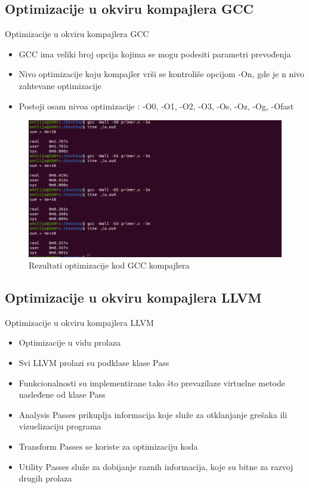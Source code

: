 \documentclass[compress, containsverbatim,mathserif, xcolor=dvipsnames, unicode]{beamer}
\begin{document}
\subsection{Optimizacije u okviru kompajlera GCC}
\begin{frame}{Optimizacije u okviru kompajlera GCC}
    \begin{itemize}
        \item GCC ima veliki broj opcija kojima se mogu podesiti parametri prevođenja
        \item Nivo optimizacije koju kompajler vrši se kontroliše
opcijom -On, gde je n nivo zahtevane optimizacije
        \item Postoji osam nivoa optimizacije : -O0, -O1, -O2, -O3, -Os, -Oz, -Og, -Ofast
    \end{itemize}
     \begin{figure}[h!]
        \begin{center}
       \includegraphics[scale = 0.3]{../pics/test.png}
       \end{center}
       \caption{Rezultati optimizacije kod GCC kompajlera}
    \end{figure}    
\end{frame}

\subsection{Optimizacije u okviru kompajlera LLVM}
\begin{frame}{Optimizacije u okviru kompajlera LLVM}
    \begin{itemize}
        \item Optimizacije u vidu prolaza
        \item Svi LLVM prolazi su podklase klase Pass
        \item Funkcionalnosti su implementirane tako što prevazilaze virtuelne metode nasleđene od klase Pass
        \item Analysis Passes prikuplja informacija koje 
služe za otklanjanje grešaka ili vizuelizaciju programa
        \item Transform Passes se koriste za optimizaciju koda
        \item Utility Passes služe za dobijanje raznih
informacija, koje su bitne za razvoj drugih prolaza
    \end{itemize}    
\end{frame}
\end{document}
